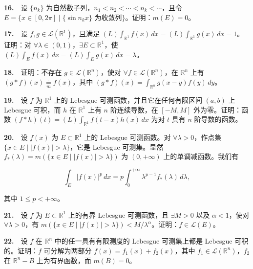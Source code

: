 \documentclass[11pt,a4paper]{article}
\begin{document}
\par{}\hypertarget{review16}{}\noindent \textbf{16.}　设 \(\{n_k\}\) 为自然数子列，\(n_1<n_2<\cdots<n_k<\cdots\)，且令 \(E=\{x\in[0,2\pi]\mid\{\sin n_kx\}\text{ 为收敛列}\}\)。证明：\(m(E)=0\)。

\par{}\hypertarget{review17}{}\noindent \textbf{17.}　设 \(f,g\in\mathcal L(\mathbb R^1)\)，且满足 \((L)\int_{\mathbb R^1}f(x)\,dx=(L)\int_{\mathbb R^1}g(x)\,dx=1\)。证明：对 \(\forall\lambda\in(0,1)\)，\(\exists E\subset\mathbb R^1\)，使 \((L)\int_E f(x)\,dx=(L)\int_Eg(x)\,dx=\lambda\)。

\par{}\hypertarget{review18}{}\noindent \textbf{18.}　证明：不存在 \(g\in\mathcal L(\mathbb R^n)\)，使对 \(\forall f\in\mathcal L(\mathbb R^n)\)，在 \(\mathbb R^n\) 上有 \((g*f)(x)\underset{m}{\overset{\cdot}{=}} f(x)\)，其中 \((g*f)(x)=\int_{\mathbb R^n}g(x-y)f(y)\,dy\)。

\par{}\hypertarget{review19}{}\noindent \textbf{19.}　设 \(f\) 为 \(\mathbb R^1\) 上的 Lebesgue 可测函数，并且它在任何有限区间 \((a,b)\) 上 Lebesgue 可积，而 \(h\) 在 \(\mathbb R^1\) 上有 \(n\) 阶连续导数，在 \([-M,M]\) 外为零。证明：函数 \((f*h)(t)=(L)\int_{\mathbb R^1} f(t-x)h(x)\,dx\) 为对 \(t\) 具有 \(n\) 阶导数的函数。

\par{}\hypertarget{review20}{}\noindent \textbf{20.}　设 \(f(x)\) 为 \(E\subset\mathbb R^1\) 上的 Lebesgue 可测函数。对 \(\forall\lambda>0\)，作点集 \(\{x\in E\mid |f(x)|>\lambda\}\)，它是 Lebesgue 可测集。显然 \(f_*(\lambda)=m(\{x\in E\mid |f(x)|>\lambda\})\) 为 \((0,+\infty)\) 上的单调减函数。我们有

\[
\int_E |f(x)|^p\,dx=p\int_0^{+\infty}\lambda^{p-1} f_*(\lambda)\,d\lambda,
\]

其中 \(1\le p<+\infty\)。

\par{}\hypertarget{review21}{}\noindent \textbf{21.}　设 \(f\) 为 \(E\subset\mathbb R^1\) 上的有界 Lebesgue 可测函数，且 \(\exists M>0\) 以及 \(\alpha<1\)，使对 \(\forall\lambda>0\)，有 \(m(\{x\in E\mid |f(x)|>\lambda\})<M/\lambda^\alpha\)。证明：\(f\in\mathcal L(E)\)。

\par{}\hypertarget{review22}{}\noindent \textbf{22.}　设 \(f\) 在 \(\mathbb R^n\) 中的任一具有有限测度的 Lebesgue 可测集上都是 Lebesgue 可积的。证明：\(f\) 可分解为两部分 \(f(x)=f_1(x)+f_2(x)\)，其中 \(f_1\in\mathcal L(\mathbb R^n)\)，\(f_2\) 在 \(\mathbb R^n-B\) 上为有界函数，而 \(m(B)=0\)。
\end{document}

